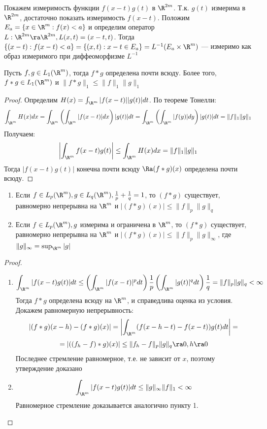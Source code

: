\begin{note}
    Покажем измеримость функции \(f(x - t)g(t)\) в \(\R^{2m}\). Т.к. \(g(t)\) измерима в \(\R^{2m}\), достаточно показать измеримость \(f(x - t)\). Положим \(E_a = \{x \in \R^m: f(x) < a\}\) и определим оператор \(L: \R^{2m} \ra \R^{2m}, L(x, t) = (x - t, t)\). Тогда \(\{(x - t): f(x - t) < a\} = \{(x, t): x - t \in E_a\} = L^{-1}(E_a \times \R^m)\) --- измеримо как образ измеримого при диффеоморфизме \(L^{-1}\)
\end{note}

\begin{lemma}
    Пусть \(f, g \in L_1(\R^m)\), тогда \(f * g\) определена почти всюду. Более того, \(f * g \in L_1(\R^m)\) и \(\|f * g\|_1 \le \|f\|_1\|g\|_1\)
\end{lemma}
\begin{proof}
    Определим \(H(x) = \int_{\R^m}|f(x - t)||g(t)|dt\). По теореме Тонелли:
    \[\int_{\R^m}H(x)dx = \int_{\R^m}\left( \int_{\R^m}|f(x - t)| dx\right)|g(t)|dt = \int_{\R^m}\left( \int_{\R^m}|f(y)| dy\right)|g(t)|dt = \|f\|_1\|g\|_1\]
    Получаем:
    \[\left|\int_{\R^m}f(x - t)g(t)\right| \le \int_{\R^m}H(x)dx = \|f\|_1\|g\|_1\]
    Тогда \(|f(x - t)g(t)|\) конечна почти всюду \(\Ra (f * g)(x)\) определена почти всюду.
\end{proof}

\begin{theorem}
    \begin{enumerate}
        \item Если \(f \in L_p(\R^m), g \in L_q(\R^m), \frac{1}{p} + \frac{1}{q} = 1\), то \((f * g)\) существует, равномерно непрерывна на \(\R^m\) и \(|(f * g)(x)| \le \|f\|_p\|g\|_q\)
        \item Если \(f \in L_p(\R^m), g\) измерима и ограничена в \(\R^m\), то \((f * g)\) существует, равномерно непрерывна на \(\R^m\) и \(|(f * g)(x)| \le \|f\|_p\|g\|_\infty\), где \(\|g\|_\infty = \sup_{\R^m} |g|\)
    \end{enumerate}
\end{theorem}
\begin{proof}\indent
    \begin{enumerate}
        \item \[\int_{\R^m} |f(x - t)g(t)|dt \le \left( \int_{\R^m}|f(x - t)|^p dt\right)\frac{1}{p} \left( \int_{\R^m}|g(t)|^q dt\right)\frac{1}{q}= \|f\|_p\|g\|_q < \infty\]
        Тогда \(f * g\) определена всюду на \(\R^m\), и справедлива оценка из условия. Докажем равномерную непрерывность:
        \[|(f * g)(x - h) - (f * g)(x)| = \left| \int_{\R^m}(f(x - h - t) - f(x - t))g(t)dt \right| = \]
        \[= |((f_h - f) * g)(x)| \le \|f_h - f\|_p\|g\|_q \ra 0, h \ra 0\]
        Последнее стремление равномерное, т.е. не зависит от \(x\), поэтому утверждение доказано
        \item \[\int_{\R^m} |f(x - t)g(t)|dt \le \|g\|_\infty \|f\|_1 < \infty\]
        Равномерное стремление доказывается аналогично пункту 1.
    \end{enumerate}
\end{proof}

